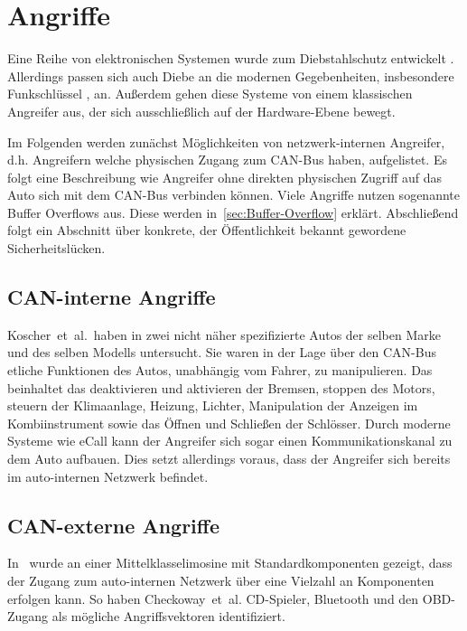\chapter{Angriffe}\label{ch:attack}

Eine Reihe von elektronischen Systemen wurde zum Diebstahlschutz entwickelt
\cite{Song2008,Turner1999,Hwang1997}. Allerdings passen sich auch Diebe an die
modernen Gegebenheiten, insbesondere Funkschlüssel \cite{Lee2014}, an. Außerdem
gehen diese Systeme von einem klassischen Angreifer aus, der sich
ausschließlich auf der Hardware-Ebene bewegt.

Im Folgenden werden zunächst Möglichkeiten von netzwerk-internen Angreifer,
d.h. Angreifern welche physischen Zugang zum CAN-Bus haben, aufgelistet. Es
folgt eine Beschreibung wie Angreifer ohne direkten physischen Zugriff auf das
Auto sich mit dem CAN-Bus verbinden können. Viele Angriffe nutzen sogenannte
Buffer Overflows aus. Diese werden in~\cref{sec:Buffer-Overflow} erklärt.
Abschließend folgt ein Abschnitt über konkrete, der Öffentlichkeit bekannt
gewordene Sicherheitslücken.


\section{CAN-interne Angriffe}
Koscher~et~al.~haben in \cite{Koscher2010} zwei nicht näher spezifizierte Autos
der selben Marke und des selben Modells untersucht. Sie waren in der Lage über
den CAN-Bus etliche Funktionen des Autos, unabhängig vom Fahrer, zu
manipulieren. Das beinhaltet das deaktivieren und aktivieren der Bremsen,
stoppen des Motors, steuern der Klimaanlage, Heizung, Lichter, Manipulation der
Anzeigen im Kombiinstrument sowie das Öffnen und Schließen der Schlösser. Durch
moderne Systeme wie eCall kann der Angreifer sich sogar einen
Kommunikationskanal zu dem Auto aufbauen. Dies setzt allerdings voraus, dass
der Angreifer sich bereits im auto-internen Netzwerk befindet.

\section{CAN-externe Angriffe}
In~\cite{Checkoway2011} wurde an einer Mittelklasselimosine mit
Standardkomponenten gezeigt, dass der Zugang zum auto-internen Netzwerk über
eine Vielzahl an Komponenten erfolgen kann. So haben Checkoway~et~al.
CD-Spieler, Bluetooth und den OBD-Zugang als mögliche Angriffsvektoren
identifiziert.

